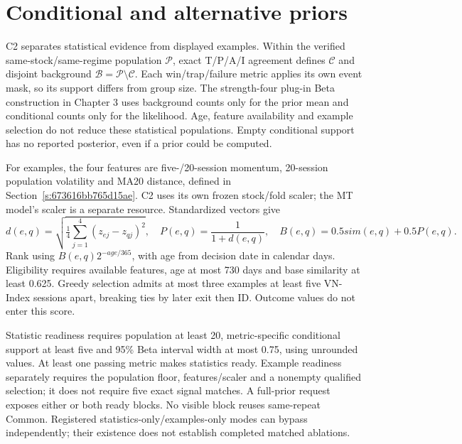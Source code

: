 \section{Conditional and alternative priors}\label{s:280f714ba62ef1fc}
C2 separates statistical evidence from displayed examples. Within the
verified same-stock/same-regime population $\mathcal P$, exact T/P/A/I
agreement defines $\mathcal C$ and disjoint background
$\mathcal B=\mathcal P\setminus\mathcal C$. Each win/trap/failure metric
applies its own event mask, so its support differs from group size. The
strength-four plug-in Beta construction in Chapter 3 uses background
counts only for the prior mean and conditional counts only for the
likelihood. Age, feature availability and example selection do not reduce
these statistical populations. Empty conditional support has no reported
posterior, even if a prior could be computed.

For examples, the four features are five-/20-session momentum, 20-session
population volatility and MA20 distance, defined in
Section~\ref{s:673616bb765d15ae}. C2 uses its own frozen stock/fold scaler;
the MT model's scaler is a separate resource. Standardized vectors give
\begin{equation}
d(e,q)=\sqrt{\tfrac14\sum_{j=1}^4(z_{ej}-z_{qj})^2},\quad
P(e,q)=\frac1{1+d(e,q)},\quad B(e,q)=0.5sim(e,q)+0.5P(e,q).
\end{equation}
Rank using $B(e,q)2^{-age/365}$, with age from decision date in calendar
days. Eligibility requires available features, age at most 730 days and
base similarity at least 0.625. Greedy selection admits at most three
examples at least five VN-Index sessions apart, breaking ties by later
exit then ID. Outcome values do not enter this score.

Statistic readiness requires population at least 20, metric-specific
conditional support at least five and 95\% Beta interval width at most
0.75, using unrounded values. At least one passing metric makes statistics
ready. Example readiness separately requires the population floor,
features/scaler and a nonempty qualified selection; it does not require
five exact signal matches. A full-prior request exposes either or both
ready blocks. No visible block reuses same-repeat Common. Registered
statistics-only/examples-only modes can bypass independently; their
existence does not establish completed matched ablations.


